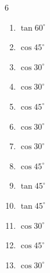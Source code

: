 \begin{multicols}{6}
\begin{enumerate}
  \item $\displaystyle \tan{60^\circ}$


  \item $\displaystyle \cos{45^\circ}$


  \item $\displaystyle \cos{30^\circ}$


  \item $\displaystyle \cos{30^\circ}$


  \item $\displaystyle \cos{45^\circ}$


  \item $\displaystyle \cos{30^\circ}$


  \item $\displaystyle \cos{30^\circ}$


  \item $\displaystyle \cos{45^\circ}$


  \item $\displaystyle \tan{45^\circ}$

        \phantom{$\displaystyle =1$}

  \item $\displaystyle \tan{45^\circ}$

        \phantom{$\displaystyle =1$}

  \item $\displaystyle \cos{30^\circ}$


  \item $\displaystyle \cos{45^\circ}$


  \item $\displaystyle \cos{30^\circ}$


\end{enumerate}
\end{multicols}
